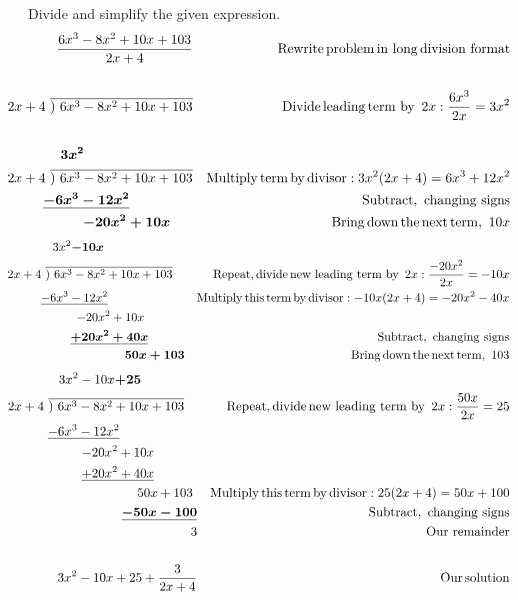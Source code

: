 \begin{example}~~~Divide and simplify the given expression.
  \begin{eqnarray*}
    \frac{6 x^3 - 8 x^2 + 10 x + 103}{2 x + 4} &  & \operatorname{Rewrite}
    \operatorname{problem} \operatorname{in~long} \operatorname{division~format}\\
    &  & \\
    2 x + 4~ \overline{)~6 x^3 - 8 x^2 + 10 x + 103} &  & \operatorname{Divide}
    \operatorname{leading} \operatorname{term~by~} 2x: \frac{6 x^3}{2 x} = 3 x^2\\
    &  & \\
    \boldsymbol{3 x^2}~~~~~~~~~~~~~~~~~~~~~~~~  &  & \\
    2 x + 4~ \overline{)~6 x^3 - 8 x^2 + 10 x + 103} &  & \operatorname{Multiply}
    \operatorname{term} \operatorname{by} \operatorname{divisor} : 3 x^2 (2 x + 4) = 6 x^3 + 12 x^2\\
    \underline{\boldsymbol{- 6 x^3 - 12 x^2 }}~~~~~~~~~~~~~~  &  & \operatorname{Subtract,~changing~signs}\\
    \boldsymbol{- 20 x^2 + 10 x}~~~~~ &  & \operatorname{Bring} \operatorname{down} \operatorname{the}
    \operatorname{next} \operatorname{term},~10x
  \end{eqnarray*}
	\begin{eqnarray*}
		3 x^2 \boldsymbol{- 10 x}~~~~~~~~~~~~~~~~~~~~  &  & \\
    2 x + 4~ \overline{)~6 x^3 - 8 x^2 + 10 x + 103}~~~ &  & \operatorname{Repeat},
    \operatorname{divide} \operatorname{new~leading~term~by~} 2x: \frac{- 20 x^2}{2 x} = - 10 x\\
    \underline{- 6 x^3 - 12 x^2 }~~~~~~~~~~~~~~~~~~~  &  & \operatorname{Multiply} \operatorname{this}
    \operatorname{term} \operatorname{by} \operatorname{divisor} :- 10 x (2 x + 4) = - 20 x^2 - 40 x\\
    - 20 x^2 + 10 x~~~~~~~~~~ &  & \\
    \boldsymbol{\underline{+ 20 x^2 + 40 x}}~~~~~~~~~ &  & \operatorname{Subtract,~changing~signs}\\
    \boldsymbol{50 x + 103} &  & \operatorname{Bring} \operatorname{down} \operatorname{the} \operatorname{next}
    \operatorname{term},~103
  \end{eqnarray*}
	\begin{eqnarray*}
    3 x^2 - 10 x \boldsymbol{+ 25}~~~~~~~~~~~~~  &  & \\
    2 x + 4~ \overline{)~6 x^3 - 8 x^2 + 10 x + 103}~~~ &  & \operatorname{Repeat},
    \operatorname{divide} \operatorname{new~leading~term~by~} 2x: \frac{50 x}{2 x} = 25\\
    \underline{- 6 x^3 - 12 x^2 }~~~~~~~~~~~~~~~~~~  &  & \\
    - 20 x^2 + 10 x~~~~~~~~~~ &  & \\
    \underline{+ 20 x^2 + 40 x}~~~~~~~~~~ &  & \\
    50 x + 103~ &  & \operatorname{Multiply} \operatorname{this} \operatorname{term} \operatorname{by}
    \operatorname{divisor} : 25 (2 x + 4) = 50 x + 100\\
    \boldsymbol{\underline{- 50 x - 100}} &  & \operatorname{Subtract,~changing~signs}\\
    3 &  &\text{Our~remainder}\\
    &  & \\
    3 x^2 - 10 x + 25 + \frac{3}{2 x + 4} &  & \operatorname{Our} \operatorname{solution}
  \end{eqnarray*}
\end{example}
